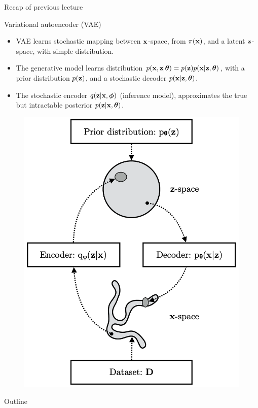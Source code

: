 \begin{frame}{Recap of previous lecture}
	\begin{minipage}[t]{0.55\columnwidth}
		\begin{block}{Variational autoencoder (VAE)}
		    \begin{itemize}
			    \item VAE learns stochastic mapping between $\mathbf{x}$-space, from $\pi(\mathbf{x})$, and a latent $\mathbf{z}$-space, with simple distribution. 
			    \item The generative model learns  distribution $p(\mathbf{x}, \mathbf{z} | \boldsymbol{\theta}) = p(\mathbf{z}) p(\mathbf{x} |\mathbf{z}, \boldsymbol{\theta})$, with a prior distribution $p(\mathbf{z})$, and a stochastic decoder $p(\mathbf{x}|\mathbf{z}, \boldsymbol{\theta})$. 
			    \item The stochastic encoder $q(\mathbf{z}|\mathbf{x}, \boldsymbol{\phi})$ (inference model), approximates the true but intractable posterior $p(\mathbf{z}|\mathbf{x}, \boldsymbol{\theta})$.
		    \end{itemize}
	    \end{block}
	\end{minipage}%
	\begin{minipage}[t]{0.45\columnwidth}
		\vspace{0.7cm}
		\begin{figure}[h]
			\centering
			\includegraphics[width=\linewidth]{figs/vae_scheme}
		\end{figure}
	\end{minipage}
	
\end{frame}
\begin{frame}{Outline}
	\tableofcontents
\end{frame}
